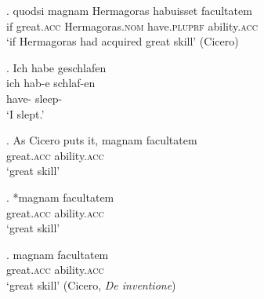 

\ex. \gll quodsi magnam Hermagoras habuisset facultatem \\
     if great.\textsc{acc} Hermagoras.\textsc{nom} have.\textsc{pluprf} ability.\textsc{acc} \\
     `if Hermagoras had acquired great skill' (Cicero)

\ex. \glll Ich habe geschlafen \\
      ich hab-e schlaf-en \\
       have- sleep- \\
      `I slept.'

\ex. As Cicero puts it, \gll magnam facultatem \\
     great.\textsc{acc} ability.\textsc{acc} \\
     `great skill'

\ex. *\gll magnam facultatem \\
     great.\textsc{acc} ability.\textsc{acc} \\
     `great skill'

\ex. \gll magnam facultatem \\
     great.\textsc{acc} ability.\textsc{acc} \\
     `great skill'
\glt (Cicero, \emph{De inventione})

